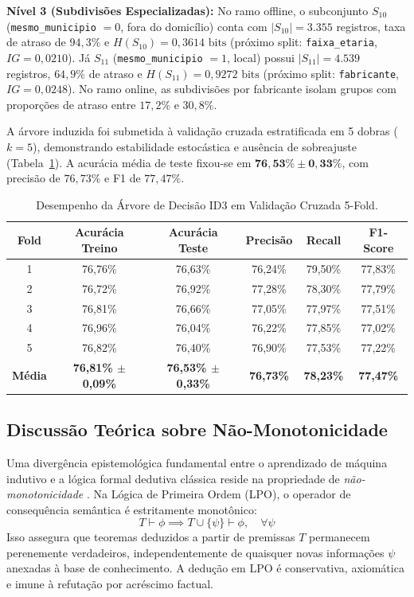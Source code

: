 \documentclass[12pt]{article}
\begin{document}
\textbf{Nível 3 (Subdivisões Especializadas):}
No ramo offline, o subconjunto $S_{10}$ (\texttt{mesmo\_municipio} $= 0$, fora do domicílio) conta com $|S_{10}| = 3.355$ registros, taxa de atraso de $94,3\%$ e $H(S_{10}) = 0,3614 \text{ bits}$ (próximo split: \texttt{faixa\_etaria}, $IG = 0,0210$). Já $S_{11}$ (\texttt{mesmo\_municipio} $= 1$, local) possui $|S_{11}| = 4.539$ registros, $64,9\%$ de atraso e $H(S_{11}) = 0,9272 \text{ bits}$ (próximo split: \texttt{fabricante}, $IG = 0,0248$). No ramo online, as subdivisões por fabricante isolam grupos com proporções de atraso entre $17,2\%$ e $30,8\%$.

A árvore induzida foi submetida à validação cruzada estratificada em 5 dobras ($k=5$), demonstrando estabilidade estocástica e ausência de sobreajuste (Tabela~\ref{tab:cv_arvore}). A acurácia média de teste fixou-se em $\mathbf{76,53\% \pm 0,33\%}$, com precisão de $76,73\%$ e F1 de $77,47\%$.

\begin{table}[htbp]
\centering
\footnotesize
\caption{Desempenho da Árvore de Decisão ID3 em Validação Cruzada 5-Fold.}
\label{tab:cv_arvore}
\begin{tabular}{cccccc}
\toprule
\textbf{Fold} & \textbf{Acurácia Treino} & \textbf{Acurácia Teste} & \textbf{Precisão} & \textbf{Recall} & \textbf{F1-Score} \\
\midrule
1 & 76,76\% & 76,63\% & 76,24\% & 79,50\% & 77,83\% \\
2 & 76,72\% & 76,92\% & 77,28\% & 78,30\% & 77,79\% \\
3 & 76,81\% & 76,66\% & 77,05\% & 77,97\% & 77,51\% \\
4 & 76,96\% & 76,04\% & 76,22\% & 77,85\% & 77,02\% \\
5 & 76,82\% & 76,40\% & 76,90\% & 77,53\% & 77,22\% \\
\midrule
\textbf{Média} & \textbf{76,81\% $\pm$ 0,09\%} & \textbf{76,53\% $\pm$ 0,33\%} & \textbf{76,73\%} & \textbf{78,23\%} & \textbf{77,47\%} \\
\bottomrule
\end{tabular}
\end{table}

\subsection{Discussão Teórica sobre Não-Monotonicidade}

Uma divergência epistemológica fundamental entre o aprendizado de máquina indutivo e a lógica formal dedutiva clássica reside na propriedade de \textit{não-monotonicidade} \cite{russell2021}. Na Lógica de Primeira Ordem (LPO), o operador de consequência semântica é estritamente monotônico:
\begin{equation}
T \vdash \phi \implies T \cup \{\psi\} \vdash \phi, \quad \forall \psi
\end{equation}
Isso assegura que teoremas deduzidos a partir de premissas $T$ permanecem perenemente verdadeiros, independentemente de quaisquer novas informações $\psi$ anexadas à base de conhecimento. A dedução em LPO é conservativa, axiomática e imune à refutação por acréscimo factual.
\end{document}
